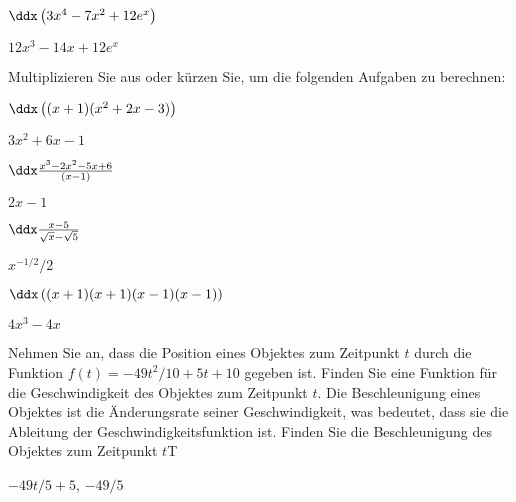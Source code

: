 \begin{exercises}
\begin{exercise} $\ddx \left(3x^4 -7x^2 +12 e^x\right)$
\begin{answer} $12x^3-14x +12 e^x$
\end{answer}\end{exercise}
\endtwocol

\noindent Multiplizieren Sie aus oder kürzen Sie, um die folgenden Aufgaben zu berechnen:

\twocol

\begin{exercise} $\ddx \left((x+1)(x^2+2x-3)\right)$
\begin{answer} $3x^2+6x-1$
\end{answer}\end{exercise}

\begin{exercise} $\ddx \frac{x^3 -2x^2 -5x + 6}{(x-1)}$
\begin{answer} $2x-1 $
\end{answer}\end{exercise}

\begin{exercise} $\ddx \frac{x-5}{\sqrt{x}-\sqrt{5}}$
\begin{answer} $x^{-1/2}/2 $
\end{answer}\end{exercise}

\begin{exercise} $\ddx \left((x+1)(x+1)(x-1)(x-1)\right)$
\begin{answer} $4x^3-4x$
\end{answer}\end{exercise}

\endtwocol

\begin{exercise} Nehmen Sie an, dass die Position eines Objektes zum Zeitpunkt $t$ durch die Funktion
$f(t)=-49 t^2/10+5t+10$ gegeben ist. Finden Sie eine Funktion für die Geschwindigkeit des Objektes zum Zeitpunkt $t$. Die Beschleunigung eines Objektes ist die Änderungsrate seiner Geschwindigkeit, was bedeutet, dass sie die Ableitung der Geschwindigkeitsfunktion ist. Finden Sie die Beschleunigung des Objektes zum Zeitpunkt $t$T
\begin{answer} $-49t/5+5$, $-49/5$
\end{answer}\end{exercise}


\end{exercises}
